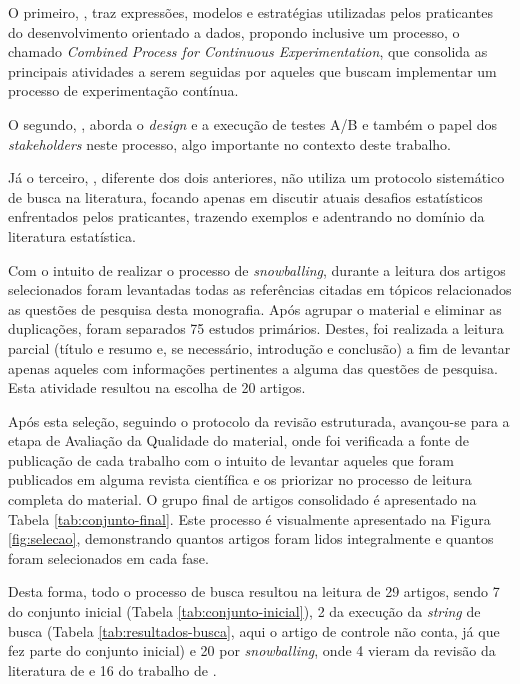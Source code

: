 O primeiro, , traz expressões, modelos e estratégias utilizadas pelos praticantes do desenvolvimento orientado a dados, propondo inclusive um processo, o chamado \textit{Combined Process for Continuous Experimentation}, que consolida as principais atividades a serem seguidas por aqueles que buscam implementar um processo de experimentação contínua.

O segundo, , aborda o  \textit{design} e a execução de testes A/B e também o papel dos \textit{stakeholders} neste processo, algo importante no contexto deste trabalho. 

Já o terceiro, , diferente dos dois anteriores, não utiliza um protocolo sistemático de busca na literatura, focando apenas em discutir atuais desafios estatísticos enfrentados pelos praticantes, trazendo exemplos e adentrando no domínio da literatura estatística.

Com o intuito de realizar o processo de \textit{snowballing}, durante a leitura dos artigos selecionados foram levantadas todas as referências citadas em tópicos relacionados as questões de pesquisa desta monografia. Após agrupar o material e eliminar as duplicações, foram separados 75 estudos primários. Destes, foi realizada a leitura parcial (título e resumo e, se necessário, introdução e conclusão) a fim de levantar apenas aqueles com informações pertinentes a alguma das questões de pesquisa. Esta atividade resultou na escolha de 20 artigos.

Após esta seleção, seguindo o protocolo da revisão estruturada, avançou-se para a etapa de Avaliação da Qualidade do material, onde foi verificada a fonte de publicação de cada trabalho com o intuito de levantar aqueles que foram publicados em alguma revista científica e os priorizar no processo de leitura completa do material. O grupo final de artigos consolidado é apresentado na Tabela \ref{tab:conjunto-final}. Este processo é visualmente apresentado na Figura \ref{fig:selecao}, demonstrando quantos artigos foram lidos integralmente e quantos foram selecionados em cada fase.

Desta forma, todo o processo de busca resultou na leitura de 29 artigos, sendo 7 do conjunto inicial (Tabela \ref{tab:conjunto-inicial}), 2 da execução da \textit{string} de busca (Tabela \ref{tab:resultados-busca}, aqui o artigo de controle não conta, já que fez parte do conjunto inicial) e 20 por \textit{snowballing}, onde 4 vieram da revisão da literatura de  \cite{yu_new_2020} \cite{chen_automatic_2018} \cite{fabijan_benefits_2017} \cite{le_goues_towards_2014} e 16 do trabalho de  \cite{kuhrmann_activity_2018} \cite{bures_infrastructure_2021} \cite{kevic_characterizing_2017} \cite{liu_enterprise-level_2019} \cite{olsson_opinions_2014} \cite{fernandes_hitting_2015} \cite{melegati_hypotheses_2019} \cite{kohavi_online_2013} \cite{crook_seven_2009} \cite{issa_mattos_hurrier_2023} \cite{fabijan_online_2020} \cite{fagerholm_right_2017} \cite{fabijan_three_2019} \cite{olsson_towards_2015} \cite{sauvola_towards_2015} \cite{melegati_understanding_2021}
.

